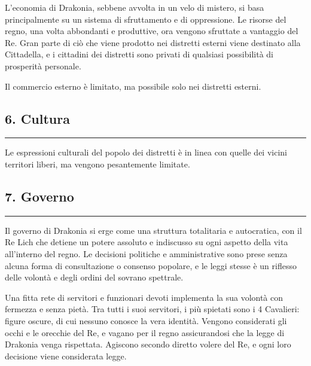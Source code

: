 L'economia di Drakonia, sebbene avvolta in un velo di mistero, si basa
principalmente su un sistema di sfruttamento e di oppressione. Le
risorse del regno, una volta abbondanti e produttive, ora vengono
sfruttate a vantaggio del Re. Gran parte di ciò che viene prodotto nei
distretti esterni viene destinato alla Cittadella, e i cittadini dei
distretti sono privati di qualsiasi possibilità di prosperità personale.

Il commercio esterno è limitato, ma possibile solo nei distretti
esterni.

\subsection{6. Cultura}\label{cultura}

\begin{center}\rule{0.5\linewidth}{0.5pt}\end{center}

Le espressioni culturali del popolo dei distretti è in linea con quelle
dei vicini territori liberi, ma vengono pesantemente limitate.

\subsection{7. Governo}\label{governo}

\begin{center}\rule{0.5\linewidth}{0.5pt}\end{center}

Il governo di Drakonia si erge come una struttura totalitaria e
autocratica, con il Re Lich che detiene un potere assoluto e indiscusso
su ogni aspetto della vita all'interno del regno. Le decisioni politiche
e amministrative sono prese senza alcuna forma di consultazione o
consenso popolare, e le leggi stesse è un riflesso delle volontà e degli
ordini del sovrano spettrale.

Una fitta rete di servitori e funzionari devoti implementa la sua
volontà con fermezza e senza pietà. Tra tutti i suoi servitori, i più
spietati sono i 4 Cavalieri: figure oscure, di cui nessuno conosce la
vera identità. Vengono considerati gli occhi e le orecchie del Re, e
vagano per il regno assicurandosi che la legge di Drakonia venga
rispettata. Agiscono secondo diretto volere del Re, e ogni loro
decisione viene considerata legge.

